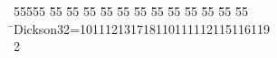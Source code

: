 %
%
\begin{tabbing}
55555 \= 55 \= 55 \= 55 \= 55 \= 55 \= 55 \= 55 \= 55 \= 55 \= 55 \= 55 \= 55 \= \>Dickson32=101112131718110111112115116119\\[0pt]
2\>\end{tabbing}
